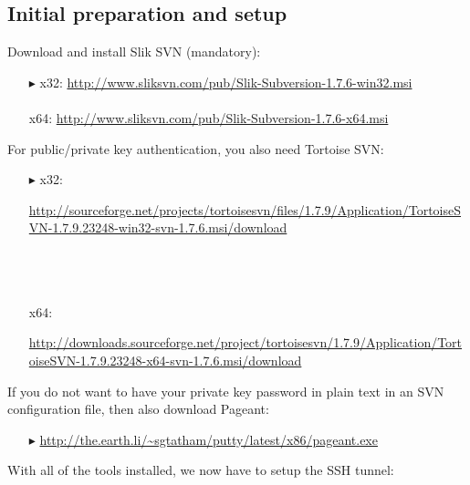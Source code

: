 \subsection{Initial preparation and setup}

Download and install Slik SVN (mandatory):
\begin{enumerate}
  \item[$\blacktriangleright$] x32: \small{\url{http://www.sliksvn.com/pub/Slik-Subversion-1.7.6-win32.msi}}\\\\
   x64: {\small \url{http://www.sliksvn.com/pub/Slik-Subversion-1.7.6-x64.msi}}
\end{enumerate}

For public/private key authentication, you also need Tortoise SVN:

\begin{enumerate}
  \item[$\blacktriangleright$] x32: {\small \begin{minipage}{.95\textwidth} 
  \url{http://sourceforge.net/projects/tortoisesvn/files/1.7.9/Application/TortoiseSVN-1.7.9.23248-win32-svn-1.7.6.msi/download}
    \end{minipage}}\\\\\\
  x64: {\small\begin{minipage}{.9\textwidth} 
  \url{http://downloads.sourceforge.net/project/tortoisesvn/1.7.9/Application/TortoiseSVN-1.7.9.23248-x64-svn-1.7.6.msi/download}\end{minipage}}
\end{enumerate}

If you do not want to have your private key password in plain text in an SVN configuration file, then also download Pageant:
\begin{enumerate}
  \item[$\blacktriangleright$] {\small \url{http://the.earth.li/~sgtatham/putty/latest/x86/pageant.exe}}
\end{enumerate}

With all of the tools installed, we now have to setup the SSH tunnel:

